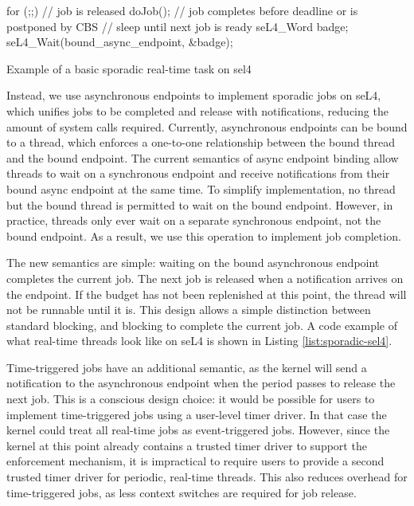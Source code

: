 \begin{listing}
\begin{ccode}
    for (;;) {
        // job is released
        doJob();
        // job completes before deadline or is postponed by CBS
        // sleep until next job is ready
        seL4_Word badge;
        seL4_Wait(bound_async_endpoint, &badge);
    }
\end{ccode}
\caption{Example of a basic sporadic real-time task on sel4}
\label{list:sporadic-sel4}
\end{listing}

Instead, we use asynchronous endpoints to implement sporadic jobs on seL4, which unifies jobs to be completed and release with notifications, reducing the amount of system calls required.
Currently, asynchronous endpoints can be bound to a thread, which enforces a one-to-one relationship between the bound thread and the bound endpoint.
The current semantics of async endpoint binding allow threads to wait on a synchronous endpoint and receive notifications from their bound async endpoint at the same time.
To simplify implementation, no thread but the bound thread is permitted to wait on the bound endpoint.
However, in practice, threads only ever wait on a separate synchronous endpoint, not the bound endpoint.
As a result, we use this operation to implement job completion.

The new semantics are simple: waiting on the bound asynchronous endpoint completes the current job.
The next job is released when a notification arrives on the endpoint.
If the budget has not been replenished at this point, the thread will not be runnable until it is.
This design allows a simple distinction between standard blocking, and blocking to complete the current job.
A code example of what real-time threads look like on seL4 is shown in Listing \ref{list:sporadic-sel4}.

Time-triggered jobs have an additional semantic, as the kernel will send a notification to the asynchronous endpoint when the period passes to release the next job.
This is a conscious design choice: it would be possible for users to implement time-triggered jobs using a user-level timer driver.
In that case the kernel could treat all real-time jobs as event-triggered jobs.
However, since the kernel at this point already contains a trusted timer driver to support the enforcement mechanism, it is impractical to require users to provide a second trusted timer driver for periodic, real-time threads.
This also reduces overhead for time-triggered jobs, as less context switches are required for job release.

